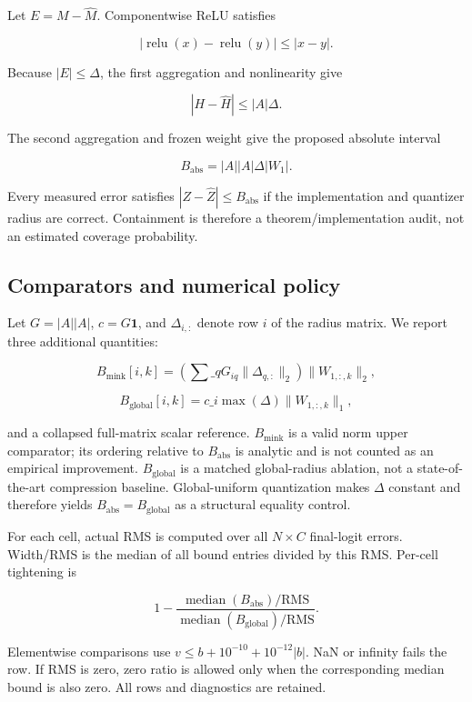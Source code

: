 \documentclass{article}
\begin{document}
Let \(E=M-\widehat M\). Componentwise ReLU satisfies

\[
|\operatorname{relu}(x)-\operatorname{relu}(y)|\le |x-y|.
\]

Because \(|E|\le\Delta\), the first aggregation and nonlinearity give

\[
|H-\widehat H|\le |A|\Delta.
\]

The second aggregation and frozen weight give the proposed absolute interval

\[
B_{\mathrm{abs}}=|A||A|\Delta|W_1|.
\]

Every measured error satisfies \(|Z-\widehat Z|\le B_{\mathrm{abs}}\) if the implementation and quantizer radius are correct. Containment is therefore a theorem/implementation audit, not an estimated coverage probability.

\subsection{Comparators and numerical policy}

\label{sec:comparators\_and\_numerical\_policy}

Let \(G=\lvert A\rvert\lvert A\rvert\), \(c=G\mathbf 1\), and \(\Delta_{i,:}\) denote row \(i\) of the radius matrix. We report three additional quantities:

\[
B_{\mathrm{mink}}[i,k]
=\left(\sum\_q G_{iq}\|\Delta_{q,:}\|_2\right)\|W_{1,:,k}\|_2,
\]

\[
B_{\mathrm{global}}[i,k]
=c\_i\max(\Delta)\|W_{1,:,k}\|_1,
\]

and a collapsed full-matrix scalar reference. \(B_{\mathrm{mink}}\) is a valid norm upper comparator; its ordering relative to \(B_{\mathrm{abs}}\) is analytic and is not counted as an empirical improvement. \(B_{\mathrm{global}}\) is a matched global-radius ablation, not a state-of-the-art compression baseline. Global-uniform quantization makes \(\Delta\) constant and therefore yields \(B_{\mathrm{abs}}=B_{\mathrm{global}}\) as a structural equality control.

For each cell, actual RMS is computed over all \(N\times C\) final-logit errors. Width/RMS is the median of all bound entries divided by this RMS. Per-cell tightening is

\[
1-\frac{\operatorname{median}(B_{\mathrm{abs}})/\mathrm{RMS}}
{\operatorname{median}(B_{\mathrm{global}})/\mathrm{RMS}}.
\]

Elementwise comparisons use \(v\le b+10^{-10}+10^{-12}|b|\). NaN or infinity fails the row. If RMS is zero, zero ratio is allowed only when the corresponding median bound is also zero. All rows and diagnostics are retained.
\end{document}
